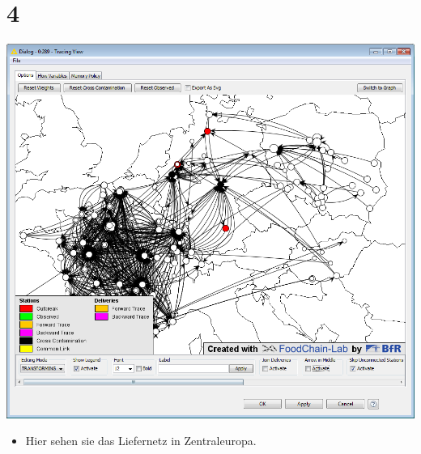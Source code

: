 \documentclass{beamer}
\begin{document}
\section{4}
\begin{frame}
	\begin{center}
  		\includegraphics[height=0.6\textheight]{4.png}
	\end{center}
	\begin{itemize}
		\item Hier sehen sie das Liefernetz in Zentraleuropa.
	\end{itemize}
\end{frame}
\end{document}
